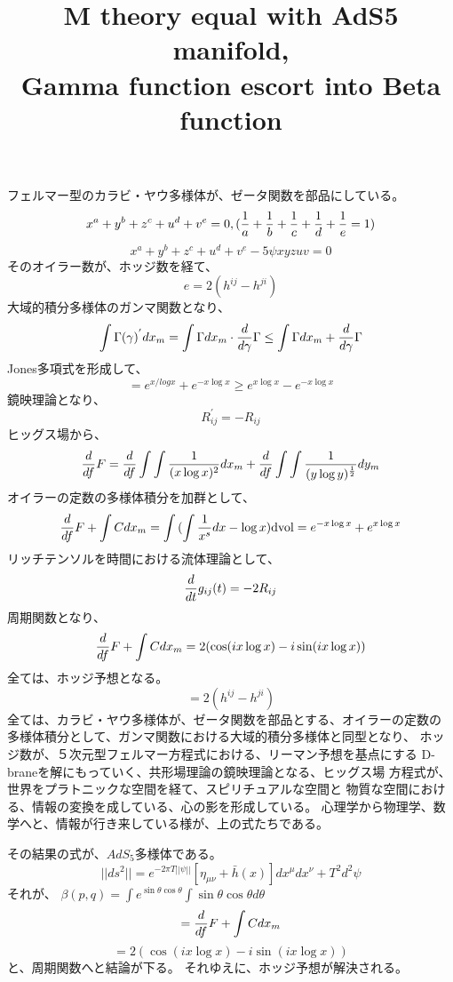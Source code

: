 \documentclass{jsarticle}
\begin{document}
\title{M theory equal with AdS5 manifold, \\
Gamma function escort into Beta function}
\author{}
\date{}
\maketitle

   フェルマー型のカラビ・ヤウ多様体が、ゼータ関数を部品にしている。
   $$ x^a + y^b + z^c + u^d + v^e = 0, ({1 \over a} + {1 \over b}
   + {1 \over c} + {1 \over d} + {1 \over e} = 1) $$
   $$ x^a + y^b + z^c + u^d + v^e - 5 \psi xyzuv = 0 $$
   そのオイラー数が、ホッジ数を経て、
   $$ e = 2(h^{ij} - h^{ji}) $$
   大域的積分多様体のガンマ関数となり、　
   $$ \int \Gamma(\gamma)^{'}dx_m = \int \Gamma dx_m \cdot {d \over d \gamma}
   \Gamma \le \int \Gamma dx_m + {d \over d \gamma}\Gamma $$
   Jones多項式を形成して、
   $$ = e^{x /log x} + e^{-x \log x} \ge e^{x \log x} - e^{-x \log x} $$
   鏡映理論となり、
   $$ R_{ij}^{'} = - R_{ij} $$
   ヒッグス場から、
   $$ {d \over df}F = {d \over df}\int\int{{1 \over {(x \log x)^2}}}dx_m 
   + {d \over df}\int\int{{1 \over {(y \log y)^{1 \over 2}}}}dy_m $$
   オイラーの定数の多様体積分を加群として、
   $$ {d \over df}F + \int C dx_m = \int {(\int {1 \over {x^s}}dx 
   - \log x)}\mathrm{dvol} = e^{-x \log x} + e^{x \log x} $$
   リッチテンソルを時間における流体理論として、
   $$ {d \over dt}g_{ij}(t) = - 2 R_{ij} $$
   周期関数となり、
   $$ {d \over df}F + \int C dx_m = 2 (\cos (i x \log x) - i\sin(i x \log x)) $$
   全ては、ホッジ予想となる。
   $$ = 2(h^{ij} - h^{ji}) $$
   全ては、カラビ・ヤウ多様体が、ゼータ関数を部品とする、オイラーの定数の
   多様体積分として、ガンマ関数における大域的積分多様体と同型となり、
   ホッジ数が、５次元型フェルマー方程式における、リーマン予想を基点にする
   D-braneを解にもっていく、共形場理論の鏡映理論となる、ヒッグス場
   方程式が、世界をプラトニックな空間を経て、スピリチュアルな空間と
   物質な空間における、情報の変換を成している、心の影を形成している。
   心理学から物理学、数学へと、情報が行き来している様が、上の式たちである。

   その結果の式が、$AdS_5$多様体である。
   $$ ||ds^2|| = e^{-2\pi T ||\psi||}[\eta_{\mu\nu} + \bar{h}(x)]
   dx^{\mu}dx^{\nu} + T^2 d^2 \psi $$
   それが、
   $\beta(p,q) = \int e^{\sin \theta \cos \theta} \int \sin \theta \cos \theta
   d \theta $
   $$ = {d \over df}F + \int C dx_m$$
   $$ = 2 (\cos (i x \log x) - i \sin(i x \log x)) $$
   と、周期関数へと結論が下る。
   それゆえに、ホッジ予想が解決される。
\end{document}
